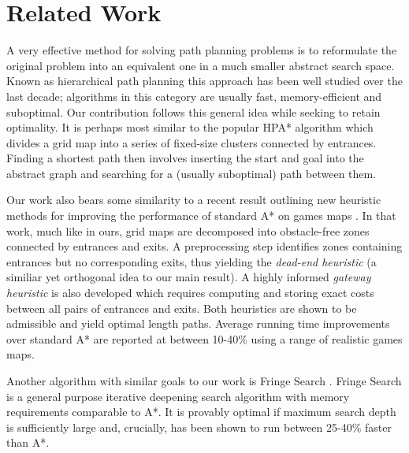 \section{Related Work}
A very effective method for solving path planning problems is to reformulate the original problem
into an equivalent one in a much smaller abstract search space. 
Known as hierarchical path planning this approach has been well studied over the last decade;
algorithms in this category are usually fast, memory-efficient and suboptimal.
Our contribution follows this general idea while seeking to retain optimality.
It is perhaps most similar to the popular HPA* algorithm \cite{botea04} 
which divides a grid map into a series of fixed-size clusters connected 
by entrances.
Finding a shortest path then involves inserting the start and goal into the 
abstract graph and searching for a (usually suboptimal) path between them.
\par
Our work also bears some similarity to a recent result outlining new heuristic methods for improving the 
performance of standard A* on games maps \cite{bjornsson06}.
In that work, much like in ours, grid maps are decomposed into obstacle-free zones connected by entrances 
and exits. 
A preprocessing step identifies zones containing entrances but no corresponding exits, thus
yielding the \emph{dead-end heuristic} (a similiar yet orthogonal idea to our main result).
A highly informed \emph{gateway heuristic} is also developed which requires computing and storing exact 
costs between all pairs of entrances and exits.
Both heuristics are shown to be admissible and yield optimal length paths. 
Average running time improvements over standard A* are reported at between 10-40\% using a range of
realistic games maps.
\par
Another algorithm with similar goals to our work is Fringe Search \cite{bjornsson05}.
Fringe Search is a general purpose iterative deepening search algorithm with memory requirements
comparable to A*. 
It is provably optimal if maximum search depth is sufficiently large and, crucially, has been shown to 
run between 25-40\% faster than A*.
